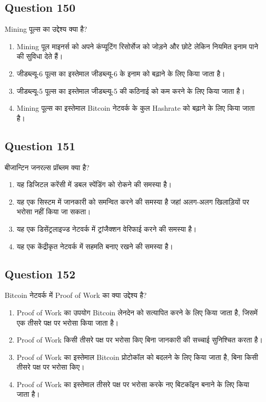 \documentclass[12pt,a4paper]{article}
\begin{document}
\bigskip


\subsection*{Question 150}
Mining पूल्स का उद्देश्य क्या है?

\begin{enumerate}[label=\Alph*., leftmargin=*]
\item Mining पूल माइनर्स को अपने कंप्यूटिंग रिसोर्सेज को जोड़ने और छोटे लेकिन नियमित इनाम पाने की सुविधा देते हैं।
\item जीडब्ल्यू-6 पूल्स का इस्तेमाल जीडब्ल्यू-6 के इनाम को बढ़ाने के लिए किया जाता है।
\item जीडब्ल्यू-5 पूल्स का इस्तेमाल जीडब्ल्यू-5 की कठिनाई को कम करने के लिए किया जाता है।
\item Mining पूल्स का इस्तेमाल Bitcoin नेटवर्क के कुल Hashrate को बढ़ाने के लिए किया जाता है।
\end{enumerate}

\bigskip


\subsection*{Question 151}
बीजान्टिन जनरल्स प्रॉब्लम क्या है?

\begin{enumerate}[label=\Alph*., leftmargin=*]
\item यह डिजिटल करेंसी में डबल स्पेंडिंग को रोकने की समस्या है।
\item यह एक सिस्टम में जानकारी को समन्वित करने की समस्या है जहां अलग-अलग खिलाड़ियों पर भरोसा नहीं किया जा सकता।
\item यह एक डिसेंट्रलाइज्ड नेटवर्क में ट्रांजैक्शन वेरिफाई करने की समस्या है।
\item यह एक केंद्रीकृत नेटवर्क में सहमति बनाए रखने की समस्या है।
\end{enumerate}

\bigskip


\subsection*{Question 152}
Bitcoin नेटवर्क में Proof of Work का क्या उद्देश्य है?

\begin{enumerate}[label=\Alph*., leftmargin=*]
\item Proof of Work का उपयोग Bitcoin लेनदेन को सत्यापित करने के लिए किया जाता है, जिसमें एक तीसरे पक्ष पर भरोसा किया जाता है।
\item Proof of Work किसी तीसरे पक्ष पर भरोसा किए बिना जानकारी की सच्चाई सुनिश्चित करता है।
\item Proof of Work का इस्तेमाल Bitcoin प्रोटोकॉल को बदलने के लिए किया जाता है, बिना किसी तीसरे पक्ष पर भरोसा किए।
\item Proof of Work का इस्तेमाल तीसरे पक्ष पर भरोसा करके नए बिटकॉइन बनाने के लिए किया जाता है।
\end{enumerate}
\end{document}
